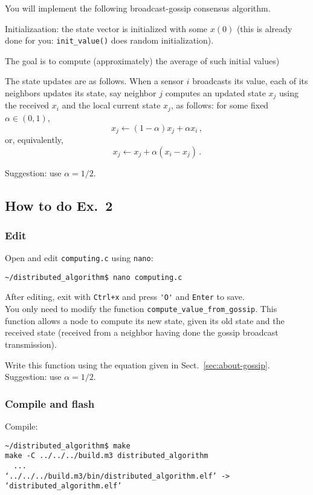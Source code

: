 \documentclass[oneside]{article}
\begin{document}
You will implement the following broadcast-gossip consensus algorithm.

Initializaation: the state vector is initialized with some $x(0)$ (this is already done for you: \verb=init_value()= does random initialization).

The goal is to compute (approximately) the average of such initial values)

The state updates are as follows. When a sensor $i$ broadcasts its value, each of its neighbors updates its state, say neighbor $j$ computes an updated state $x_j$ using the received $x_i$ and the local current state $x_j$, as follows:
 for some fixed $\alpha \in (0,1)$,
\[ x_j  \leftarrow (1- \alpha) x_j + \alpha x_i \,,\]
 or, equivalently,
\[ x_j \leftarrow x_j + \alpha (x_i-x_j) \,.\]

Suggestion: use $\alpha = 1/2$.

\subsection{How to do Ex.~2}

\subsubsection{Edit}
Open and edit \verb=computing.c= using \verb=nano=:
\begin{verbatim}~/distributed_algorithm$ nano computing.c \end{verbatim}
After editing, exit with \verb=Ctrl+x= and  press \verb='O'= and \verb=Enter= to save.\\
    

You only need to modify the function \verb=compute_value_from_gossip=.
This function allows a node to compute its new state, 
given its old state and the received state
(received from a neighbor having done the gossip broadcast transmission).

Write this function using the equation given in Sect.~\ref{sec:about-gossip}.
Suggestion: use $\alpha = 1/2$.

\subsubsection{Compile and flash}

Compile:
    \begin{verbatim}~/distributed_algorithm$ make
make -C ../../../build.m3 distributed_algorithm
  ...
‘../../../build.m3/bin/distributed_algorithm.elf’ -> ‘distributed_algorithm.elf’
\end{verbatim}
\end{document}
